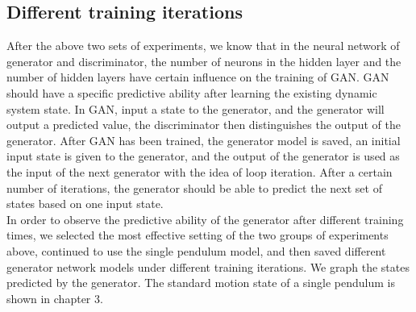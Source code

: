 \documentclass[11pt,a4paper]{article}
\begin{document}
\subsection{Different training iterations}
After the above two sets of experiments, we know that in the neural network of generator and discriminator, the number of neurons in the hidden layer and the number of hidden layers have certain influence on the training of GAN. GAN should have a specific predictive ability after learning the existing dynamic system state. In GAN, input a state to the generator, and the generator will output a predicted value, the discriminator then distinguishes the output of the generator. After GAN has been trained, the generator model is saved, an initial input state is given to the generator, and the output of the generator is used as the input of the next generator with the idea of loop iteration. After a certain number of iterations, the generator should be able to predict the next set of states based on one input state.
\\
\newline
In order to observe the predictive ability of the generator after different training times, we selected the most effective setting of the two groups of experiments above, continued to use the single pendulum model, and then saved different generator network models under different training iterations. We graph the states predicted by the generator. The standard motion state of a single pendulum is shown in chapter 3.
\\
\newline
\end{document}

